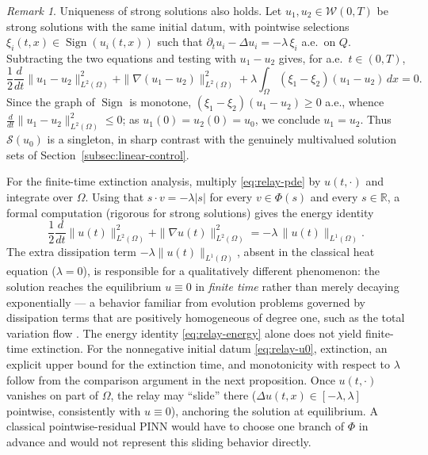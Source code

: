 \documentclass[11pt]{elsarticle}
\theoremstyle{definition}
\theoremstyle{remark}
\newtheorem{remark}[theorem]{Remark}
\numberwithin{equation}{section}
\DeclareMathOperator{\Sign}{Sign}
\begin{document}
\begin{remark}
	Uniqueness of strong solutions also holds. Let
	$u_1,u_2\in\mathcal{W}(0,T)$ be strong solutions with the same initial
	datum, with pointwise selections $\xi_i(t,x)\in\Sign(u_i(t,x))$ such
	that $\partial_tu_i-\Delta u_i=-\lambda\,\xi_i$ a.e.\ on $Q$.
	Subtracting the two equations and testing with $u_1-u_2$ gives, for
	a.e.\ $t\in(0,T)$,
	\[
	\frac12\frac{d}{dt}\|u_1-u_2\|_{L^2(\Omega)}^2
	+\|\nabla(u_1-u_2)\|_{L^2(\Omega)}^2
	+\lambda\int_\Omega(\xi_1-\xi_2)(u_1-u_2)\,dx
	=0.
	\]
	Since the graph of $\Sign$ is monotone,
	$(\xi_1-\xi_2)(u_1-u_2)\ge0$ a.e., whence
	$\frac{d}{dt}\|u_1-u_2\|_{L^2(\Omega)}^2\le0$; as $u_1(0)=u_2(0)=u_0$,
	we conclude $u_1=u_2$. Thus $\mathcal{S}(u_0)$ is a singleton, in sharp
	contrast with the genuinely multivalued solution sets of
	Section~\ref{subsec:linear-control}.
\end{remark}

For the finite-time extinction analysis, multiply \eqref{eq:relay-pde} by $u(t,\cdot)$ and integrate over $\Omega$.
Using that $s\cdot v = -\lambda|s|$ for every $v\in\Phi(s)$ and every
$s\in\mathbb{R}$, a formal computation (rigorous for strong solutions) gives
the energy identity
\begin{equation}
	\label{eq:relay-energy}
	\frac12\frac{d}{dt}\|u(t)\|_{L^2(\Omega)}^2
	+
	\|\nabla u(t)\|_{L^2(\Omega)}^2
	=
	-\lambda\,\|u(t)\|_{L^1(\Omega)}.
\end{equation}
The extra dissipation term $-\lambda\|u(t)\|_{L^1(\Omega)}$, absent in the
classical heat equation ($\lambda=0$), is responsible for a qualitatively
different phenomenon: the solution reaches the equilibrium $u\equiv0$ in
\emph{finite time} rather than merely decaying exponentially --- a behavior
familiar from evolution problems governed by dissipation terms that are
positively homogeneous of degree one, such as the total variation flow
\cite{AndreuCaselleMazon2004}. The energy identity
\eqref{eq:relay-energy} alone does not yield finite-time extinction. For
the nonnegative initial datum \eqref{eq:relay-u0}, extinction, an explicit
upper bound for the extinction time, and monotonicity with respect to
$\lambda$ follow from the comparison argument in the next proposition. Once $u(t,\cdot)$
vanishes on part of $\Omega$, the relay may ``slide'' there
($\Delta u(t,x)\in[-\lambda,\lambda]$
pointwise, consistently with $u\equiv0$), anchoring the solution at
equilibrium. A classical pointwise-residual PINN would have to choose one branch of
$\Phi$ in advance and would not represent this sliding behavior directly.
\end{document}
